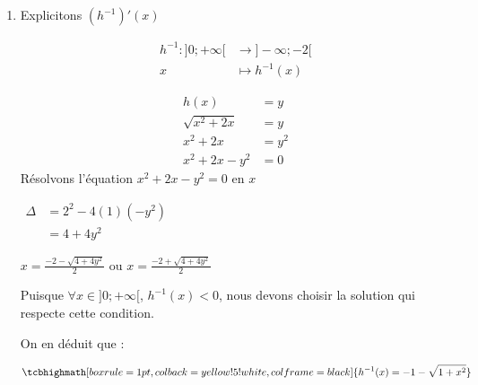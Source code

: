 \documentclass[12pt,a4paper]{article}
\begin{document}
\begin{enumerate}
\begin{enumerate}
\( \text{Donc } \boxed{ h(-3)=\sqrt{3} } \)

    \underline{\textbf{Pour} \( (h^{-1})'( \sqrt{3} )  \) }:
\[\text{On a : }  (h^{-1})'(y) = \frac{1}{h'(h^{-1}(y))} \text{donc } (h^{-1})'(\sqrt{3}) = \frac{1}{h'(h^{-1}(\sqrt{3}))}\]

Calcul de \( h^{-1}(\sqrt{3}) \):

On sait que \( h(-3) = \sqrt{3} \), donc \( h^{-1}(\sqrt{3}) = -3\)

Donc \( (h^{-1})'(\sqrt{3}) = \frac{1}{h'(h^{-1}(\sqrt{3}))}\) devient \( (h^{-1})'(\sqrt{3}) = \frac{1}{h'(-3)}\)

Calcul de \( h'(-3) \):

\(
\begin{aligned}
   h'(-3) &= \frac{-3+1}{\sqrt{(-3)^2 + 2(-3)}}\\
          &= \frac{-2}{\sqrt{9 - 6}}\\
          &= \frac{-2}{\sqrt{3}}\\
          &= -\frac{2\sqrt{3}}{3}
\end{aligned}
\)

Calcul de \( (h^{-1})'(\sqrt{3}) \)

\(
\begin{aligned}
(h^{-1})'(\sqrt{3}) &= \frac{1}{h'(-3)}
                    &= \frac{1}{-\frac{2\sqrt{3}}{3}}
                    &= -\frac{3}{2\sqrt{3}}
                    &= -\frac{\sqrt{3}}{2}
\end{aligned}
\)

\[
\boxed{(h^{-1})'(\sqrt{3}) = -\frac{\sqrt{3}}{2}}
\]
\item Explicitons \( (h^{-1})'(x) \)

\begin{align*}
h^{-1}:]0; +\infty [&\rightarrow ]-\infty ; -2[\\
x&\mapsto h^{-1}(x)
\end{align*}


\begin{align*}
    h(x) &= y\\
\sqrt{x^2 + 2x} &= y\\
    x^2 + 2x &= y^2\\
    x^2 + 2x - y^2 &= 0
\end{align*}
Résolvons l'équation \( x^2 + 2x - y^2 = 0 \) en \(x\)

\(
\begin{aligned}
    \Delta &= 2^{2}-4(1)(-y^2)\\
           &=4+4y^2
\end{aligned}
\)

\( x = \frac{-2 - \sqrt{4 + 4y^2}}{2} \) ou \( x = \frac{-2 + \sqrt{4 + 4y^2}}{2} \)

Puisque \( \forall x \in ]0; +\infty [ \), \( h^{-1}(x) < 0 \), nous devons choisir la solution qui respecte cette condition.

On en déduit que :

\[
\tcbhighmath[boxrule=1pt, colback=yellow!5!white, colframe=black]{ h^{-1}(x) = -1 - \sqrt{1 + x^2} }
\]
    \end{enumerate}
\end{enumerate}
\end{document}
